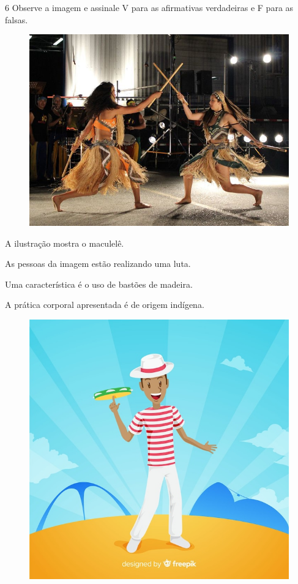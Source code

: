 \begin{mdframed}[linewidth=2pt,linecolor=salmao]
\vspace{10cm}
\end{mdframed}

\num{6} Observe a imagem e assinale V para as afirmativas verdadeiras e F para as falsas.

\begin{figure}[htpb!]
\includegraphics[width=\textwidth]{./imgs/img12.jpg}
\end{figure}

\begin{boxlist}
 A ilustração mostra o maculelê.

 As pessoas da imagem estão realizando uma luta.

 Uma característica é o uso de bastões de madeira.

 A prática corporal apresentada é de origem indígena.
\end{boxlist}


\begingroup
\begin{figure}
\includegraphics[width=.25\textwidth]{./imgs/img13.jpg}
\end{figure}

